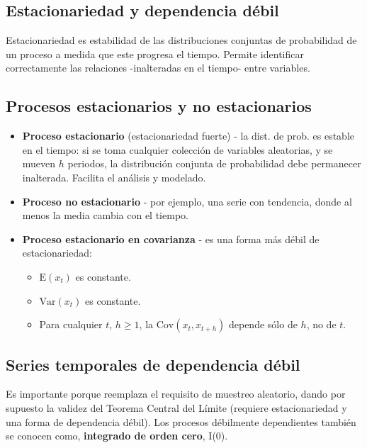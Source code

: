 \documentclass[10pt, a4paper, landscape]{extarticle}
\newcommand{\E}{\mathrm{E}}
\newcommand{\Var}{\mathrm{Var}}
\newcommand{\Cov}{\mathrm{Cov}}
\begin{document}
\begin{multicols}{3}
\section*{Estacionariedad y dependencia débil}

Estacionariedad es estabilidad de las distribuciones conjuntas de probabilidad de un proceso a medida que este progresa el tiempo. Permite identificar correctamente las relaciones -inalteradas en el tiempo- entre variables.

\subsection*{Procesos estacionarios y no estacionarios}

\begin{itemize}[leftmargin=*]
	\item \textbf{Proceso estacionario} (estacionariedad fuerte) - la dist. de prob. es estable en el tiempo: si se toma cualquier colección de variables aleatorias, y se mueven $h$ periodos, la distribución conjunta de probabilidad debe permanecer inalterada. Facilita el análisis y modelado.

\columnbreak

	\item \textbf{Proceso no estacionario} - por ejemplo, una serie con tendencia, donde al menos la media cambia con el tiempo.
	\item \textbf{Proceso estacionario en covarianza} - es una forma más débil de estacionariedad:
	\begin{itemize}[leftmargin=*]
		\item $\E(x_t)$ es constante.
		\item $\Var(x_t)$ es constante.
		\item Para cualquier $t$,  $h \geq 1$, la $\Cov(x_t, x_{t + h})$ depende sólo de $h$, no de $t$.
	\end{itemize}
\end{itemize}

\subsection*{Series temporales de dependencia débil}

Es importante porque reemplaza el requisito de muestreo aleatorio, dando por supuesto la validez del Teorema Central del Límite (requiere estacionariedad y una forma de dependencia débil). Los procesos débilmente dependientes también se conocen como, \textbf{integrado de orden cero}, I(0).


\end{multicols}
\end{document}
